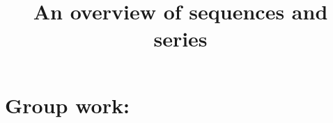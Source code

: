 \documentclass[]{ximera}
\title{An overview of sequences and series}
\begin{document}
\begin{abstract}		\end{abstract}
\maketitle



\begin{comment}
\section{Warm up:}

	\begin{freeResponse}
	
	\end{freeResponse}
	
\begin{instructorNotes}

\end{instructorNotes}
\end{comment}







\section{Group work:}
\end{document}
